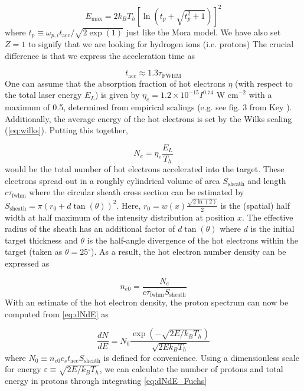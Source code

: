 \begin{equation}
	E_\text{max} = 2 k_B T_h [\ln(t_p + \sqrt{t_p^2 + 1})]^2 \label{eq:fuchs_maxE}
\end{equation}
where $t_p \equiv \omega_{p,i} t_\text{acc} / \sqrt{2 \exp(1)}$ just like the Mora model. We have also set $Z=1$ to signify that we are looking for hydrogen ions (i.e. protons) The crucial difference is that we express the acceleration time as 

\begin{equation}
	t_\text{acc} \approx 1.3 \tau_\text{FWHM} \label{eq:fuchs_multiplier}
\end{equation}
One can assume that the absorption fraction of hot electrons $\eta$ (with respect to the total laser energy $E_L$) is given by $\eta_e = 1.2 \times 10^{-15} I^{0.74} \text{ W cm}^{-2}$ with a maximum of 0.5, determined from empirical scalings (e.g. see fig. 3 from Key \cite{Key_1998_PoP}). Additionally, the average energy of the hot electrons is set by the Wilks scaling (\autoref{eq:wilks}). Putting this together, 

\begin{equation}
	N_e = \eta_e \frac{E_L}{T_h}
\end{equation}
would be the total number of hot electrons accelerated into the target. These electrons spread out in a roughly cylindrical volume of area $S_\text{sheath}$ and length $c \tau_\text{fwhm}$ where the circular sheath cross section can be estimated by $S_\text{sheath} = \pi (r_0 + d \tan(\theta))^2$. Here, $r_0 = w(x) \frac{\sqrt{2 \ln(2)}}{2}$ is the (spatial) half width at half maximum of the intensity distribution at position $x$. The effective radius of the sheath has an additional factor of $d \tan(\theta)$ where $d$ is the initial target thickness and $\theta$ is the half-angle divergence of the hot electrons within the target (taken as $\theta = 25^\circ$). As a result, the hot electron number density can be expressed as 
	
\begin{equation}
	n_{e0} = \frac{N_e}{c \tau_\text{fwhm} S_\text{sheath}}
\end{equation}
With an estimate of the hot electron density, the proton spectrum can now be computed from \cref{eq:dNdE} as 

\begin{equation}
	\frac{dN}{dE} = N_0 \frac{\exp(-\sqrt{2 E/k_B T_h})}{\sqrt{2 E k_B T_h}} \label{eq:dNdE_Fuchs}
\end{equation}
where $N_0 \equiv n_{e0} c_s t_\text{acc} S_\text{sheath}$ is defined for convenience. Using a dimensionless scale for energy $\varepsilon \equiv \sqrt{2 E / k_B T_h}$, we can calculate the number of protons and total energy in protons through integrating \autoref{eq:dNdE_Fuchs}

